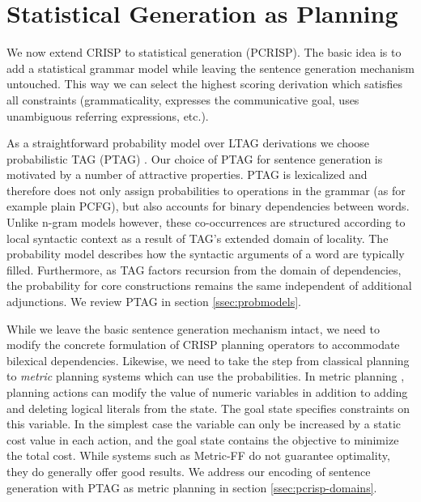 \section{Statistical Generation as Planning}
\label{sec:pcrisp}

We now extend CRISP to statistical generation (PCRISP). The basic idea is to add a statistical grammar model while leaving the sentence generation mechanism untouched. This way we can select the highest scoring derivation which satisfies all constraints (grammaticality, expresses the communicative goal, uses unambiguous referring expressions, etc.). 

 As a straightforward probability model over LTAG derivations we choose probabilistic TAG (PTAG) \cite{resnik1992}.
Our choice of PTAG for sentence generation is motivated by a number of attractive properties.
 PTAG is lexicalized and therefore does not only assign probabilities to operations in the grammar (as for example plain PCFG), but also accounts for binary dependencies between words.  Unlike n-gram models however, these co-occurrences are structured according to local syntactic context as a result of TAG's extended domain of locality. The probability model describes how the syntactic arguments of a word are typically filled. 
Furthermore, as TAG factors recursion from the domain of dependencies, the probability for core constructions remains the same independent of additional adjunctions. 
 We review PTAG in section \ref{ssec:probmodels}.

While we leave the basic sentence generation mechanism intact, we need to modify the concrete formulation of CRISP planning operators to accommodate bilexical dependencies. Likewise, we need to take the step from classical planning to \emph{metric} planning systems which can use the probabilities.
In metric planning \cite{fox2002}, planning actions can modify the value of numeric variables in addition to adding and deleting logical literals from the state. The goal state specifies constraints on this variable. In the simplest case the variable can only be increased by a static cost value in each action, and the goal state contains the objective to minimize the total cost. While systems such as Metric-{\sc FF} \cite{hoffmann2003} do not guarantee optimality, they do generally offer good results. We address our encoding of sentence generation with PTAG as metric planning in section \ref{ssec:pcrisp-domains}. 

